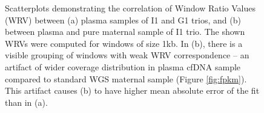 \begin{figure}
\caption{Scatterplots demonstrating the correlation of Window Ratio Values (WRV) between (a) plasma samples of I1 and G1 trios, and (b) between plasma and pure maternal sample of I1 trio. The shown WRVs were computed for windows of size 1kb. In (b), there is a visible grouping of windows with weak WRV correspondence --  an artifact of wider coverage distribution in plasma cfDNA sample compared to standard WGS maternal sample (Figure \ref{fig:fpkm}). This artifact causes (b) to have higher mean absolute error of the fit than in (a). }
\label{fig:wrv}
\hspace*{10pt}
\end{figure}
